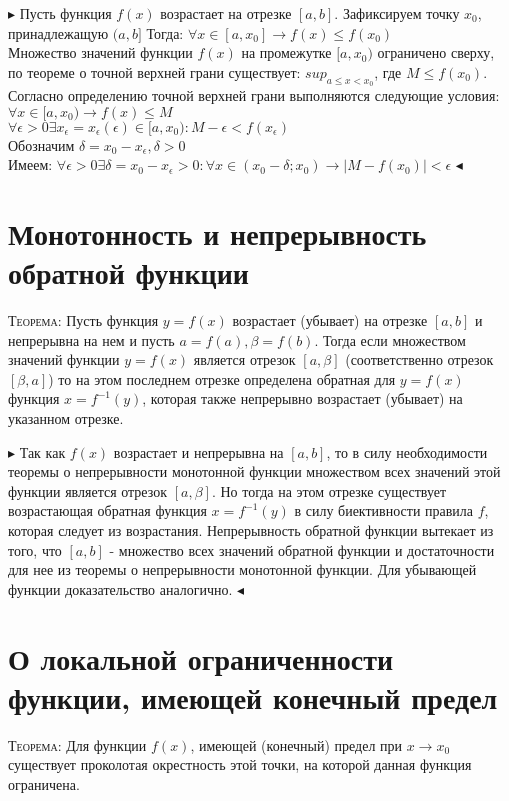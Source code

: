 \documentclass[14pt]{article}
\begin{document}
        $\blacktriangleright$
            Пусть функция $f(x)$ возрастает на отрезке $[a,b]$. Зафиксируем точку $x_0$, принадлежащую $(a,b]$ Тогда: $\forall x \in [a, x_0] \rightarrow f(x) \leqslant f(x_0) $ \\ 
            Множество значений функции $f(x)$ на промежутке $[a,x_0)$ ограничено сверху, по теореме о точной верхней грани существует: $sup_{a\leqslant x < x_0} $, где $M \leqslant f(x_0)$. \\ 
            Согласно определению точной верхней грани выполняются следующие условия: \\ 
            $\forall x  \in [a, x_0) \rightarrow f(x) \leqslant M$ \\ 
            $\forall \epsilon > 0 \exists x_\epsilon = x_\epsilon(\epsilon) \in [a, x_0):M-\epsilon<f(x_\epsilon)$ \\ 
            Обозначим $\delta = x_0 - x_\epsilon , \delta > 0$ \\ 
            Имеем: $\forall \epsilon > 0 \exists \delta = x_0 - x_\epsilon > 0: \forall x \in (x_0 - \delta; x_0) \rightarrow |M - f(x_0)| < \epsilon$
        $\blacktriangleleft$\\
    \section{Монотонность и непрерывность обратной функции}
        \textsc{Теорема:} Пусть функция $y=f(x)$ возрастает (убывает) на отрезке $[a,b]$ и непрерывна на нем и пусть $a = f(a), \beta = f(b)$. Тогда если множеством значений функции $y=f(x)$ является отрезок $[a,\beta]$ (соответственно отрезок $[\beta, a]$) то на этом последнем отрезке определена обратная для $y=f(x)$ функция $x = f^{-1}(y)$, которая также непрерывно возрастает (убывает) на указанном отрезке.

        $\blacktriangleright$ 
        Так как $f(x)$ возрастает и непрерывна на $[a,b]$, то в силу необходимости теоремы о непрерывности монотонной функции множеством всех значений этой функции является отрезок $[a, \beta]$. Но тогда на этом отрезке существует возрастающая обратная функция $x=f^{-1}(y)$ в силу биективности правила $f$, которая следует из возрастания. Непрерывность обратной функции вытекает из того, что $[a,b]$ - множество всех значений обратной функции и достаточности для нее из теоремы о непрерывности монотонной функции. Для убывающей функции доказательство аналогично.  
        $\blacktriangleleft$\\
    \section{О локальной ограниченности функции, имеющей конечный предел}
        \textsc{Теорема:} Для функции $f(x)$, имеющей (конечный) предел при $x \rightarrow x_0$ существует проколотая окрестность этой точки, на которой данная функция ограничена.
\end{document}
